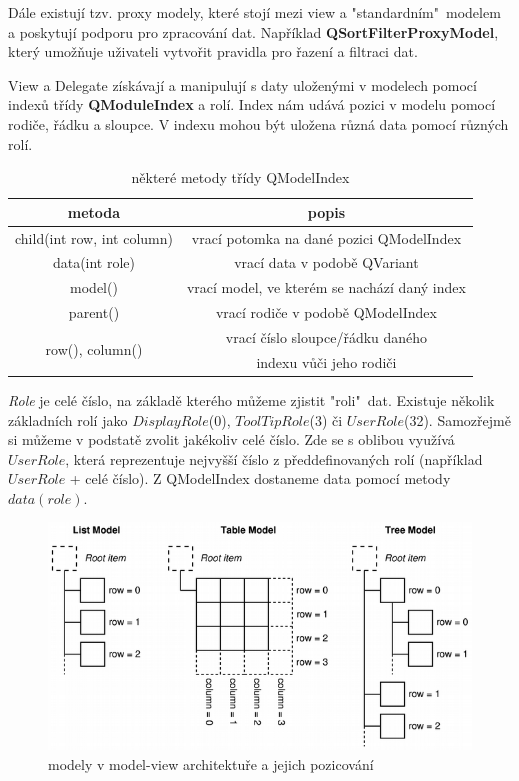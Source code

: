 Dále existují tzv. proxy modely, které stojí mezi view a "standardním"~modelem a poskytují podporu pro zpracování dat.  Například \textbf{QSortFilterProxyModel}, který umožňuje uživateli vytvořit pravidla pro řazení a filtraci dat.

View a Delegate získávají a manipulují s daty uloženými v modelech pomocí indexů třídy \textbf{QModuleIndex} a rolí. Index nám udává pozici v modelu pomocí rodiče, řádku a sloupce. V indexu mohou být uložena různá data pomocí různých rolí.

\begin{table}[h]
	\centering
	\begin{tabular}{|c|c|}
		\hline	
		{\bf metoda} & {\bf popis} \\
		\hline
		\hline
		child(int row, int column) & vrací potomka na dané pozici QModelIndex \\
		\hline
		data(int role) & vrací data v podobě QVariant \\
		\hline
		model() & vrací model, ve kterém se nachází daný index \\
		\hline
		parent() & vrací rodiče v podobě QModelIndex \\
		\hline
	 	\multirow{2}{*}{row(), column()} & vrací číslo sloupce/řádku daného \\ 
		 & indexu vůči jeho rodiči \\
		\hline
	\end{tabular}
	\caption{některé metody třídy QModelIndex}
	\label{tab:qmodelindex}
\end{table}

\textit{Role} je celé číslo, na základě kterého můžeme zjistit "roli"~dat. Existuje několik základních rolí jako $DisplayRole$(0), $ToolTipRole$(3) či $UserRole$(32). Samozřejmě si můžeme v podstatě zvolit jakékoliv celé číslo. Zde se s oblibou využívá $UserRole$, která reprezentuje nejvyšší číslo z předdefinovaných rolí (například $UserRole$ + celé číslo). Z QModelIndex dostaneme data pomocí metody $data(role)$.

\begin{figure}[h]
	\centering
	\includegraphics[scale=0.7]{pictures/qt/mv_models}
	\caption{modely v model-view architektuře a jejich pozicování}
	\label{mvModels}
\end{figure} 


